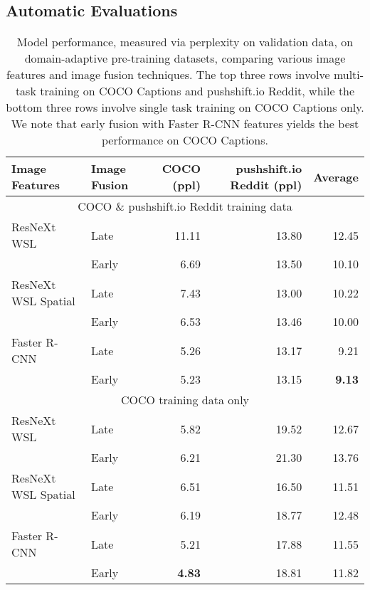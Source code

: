 \documentclass[11pt,a4paper]{article}
\begin{document}
\subsection{Automatic Evaluations}

\begin{table*}[t!]
\begin{center}
\small
\begin{tabular}{|l|l|r|r|r|}
 \hline
Image Features & Image Fusion & COCO (ppl) & pushshift.io Reddit (ppl) & Average\\
\hline
\multicolumn{5}{c}{COCO \& pushshift.io Reddit training data} \\
\hline
ResNeXt WSL & Late & 11.11 & 13.80 & 12.45\\
 & Early & 6.69 & 13.50 & 10.10\\
\hline
ResNeXt WSL Spatial & Late & 7.43 & 13.00 & 10.22 \\
 & Early & 6.53 & 13.46 & 10.00\\
\hline
Faster R-CNN & Late & 5.26 & 13.17 & 9.21 \\
 & Early & 5.23 & 13.15 & \textbf{9.13}\\
\hline
\multicolumn{5}{c}{COCO training data only} \\
\hline
ResNeXt WSL & Late & 5.82 & 19.52 & 12.67 \\
 & Early & 6.21 & 21.30 & 13.76\\
\hline
ResNeXt WSL Spatial & Late & 6.51 & 16.50 & 11.51 \\
 & Early & 6.19 & 18.77 & 12.48 \\
\hline
Faster R-CNN & Late & 5.21 & 17.88 & 11.55\\
 & Early & \textbf{4.83} & 18.81 & 11.82 \\
\hline
\end{tabular}
\caption{Model performance, measured via perplexity on validation data, on domain-adaptive pre-training datasets, comparing various image features and image fusion techniques. The top three rows involve multi-task training on COCO Captions and pushshift.io Reddit, while the bottom three rows involve single task training on COCO Captions only. We note that early fusion with Faster R-CNN features yields the best performance on COCO Captions.
\label{table:pre_training_results}
}
\end{center}
\end{table*}
\end{document}
